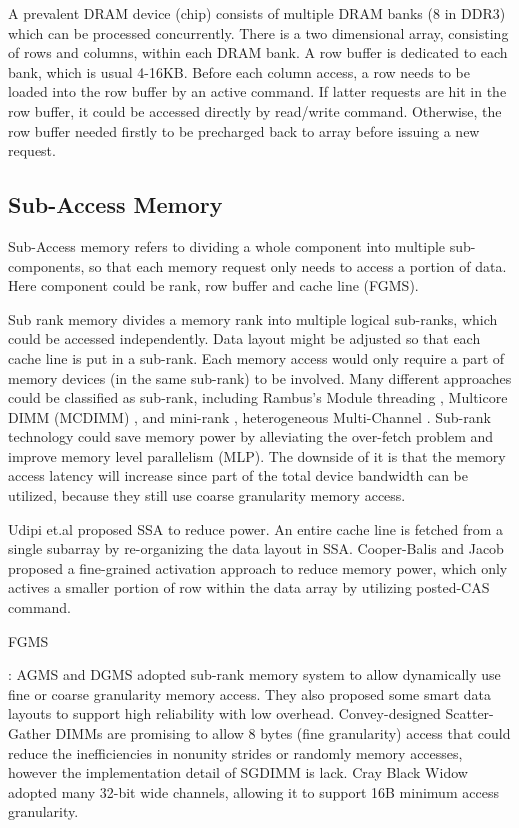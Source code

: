 \documentclass[pageno]{jpaper}
\begin{document}
A prevalent DRAM device (chip) consists of multiple DRAM banks (8 in DDR3) which can be processed concurrently. There is a two dimensional array, consisting of rows and columns, within each DRAM bank. A row buffer is dedicated to each bank, which is usual 4-16KB. Before each column access, a row needs to be loaded into the row buffer by an active command. If latter requests are hit in the row buffer, it could be accessed directly by read/write command. Otherwise, the row buffer needed firstly to be precharged back to array before issuing a new request.

\subsection {Sub-Access Memory}

Sub-Access memory refers to dividing a whole component into multiple sub-components, so that each memory request only needs to access a portion of data. Here component could be rank, row buffer and cache line (FGMS).

Sub rank memory divides a memory rank into multiple logical sub-ranks, which could be accessed independently. Data layout might be adjusted so that each cache line is put in a sub-rank. Each memory access would only require a part of memory devices (in the same sub-rank) to be involved. Many different approaches could be classified as sub-rank, including Rambus's Module threading \cite{ThreadedMemoryModule}, Multicore DIMM (MCDIMM) \cite{MulticoreDIMM,SubRank}, and mini-rank \cite{MiniRank,HeteMimiRank}, heterogeneous Multi-Channel \cite{HeneMC}. Sub-rank technology could save memory power by alleviating the over-fetch problem and improve memory level parallelism (MLP). The downside of it is that the memory access latency will increase  since
part of the total device bandwidth can be utilized, because they still use coarse granularity memory access.

Udipi et.al \cite{RethinkDRAMArch} proposed SSA to reduce power. An entire cache line is fetched from a single subarray by re-organizing the data layout in SSA. Cooper-Balis and Jacob \cite{FineGrainedActive} proposed a fine-grained activation approach to reduce memory power, which only actives a smaller portion of row within the data array by utilizing posted-CAS command.

\begin{bfseries}FGMS\end{bfseries}: AGMS and DGMS \cite{AGMS,DGMS} adopted sub-rank memory system to allow dynamically use fine or coarse granularity memory access. They also proposed some smart data layouts to support high reliability with low overhead. Convey-designed Scatter-Gather DIMMs \cite{ConveySGDIMM} are promising to allow 8 bytes (fine granularity) access that could reduce the inefficiencies in nonunity strides or randomly memory accesses, however the implementation detail of SGDIMM is lack. Cray Black Widow \cite{CrayBlackWidow} adopted many 32-bit wide channels, allowing it to support 16B minimum access granularity.
\end{document}
